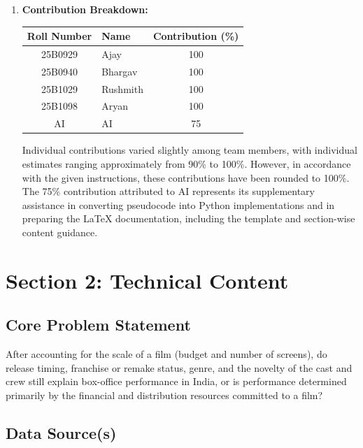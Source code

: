 \documentclass[a4paper, 11pt]{article}
\begin{document}
\begin{enumerate}
All tasks were completed, and the code was shared with Bhargav, who pushed the changes to the repository to avoid merge conflicts and ensure smooth integration.
   \item \textbf{Contribution Breakdown:}

\begin{center}
\begin{tabular}{|c|l|c|}
\hline
\textbf{Roll Number} & \textbf{Name} & \textbf{Contribution (\%)} \\
\hline
25B0929 & Ajay & 100 \\
\hline
25B0940 & Bhargav & 100 \\
\hline
25B1029 & Rushmith & 100 \\
\hline
25B1098 & Aryan & 100 \\
\hline
AI & AI & 75 \\
\hline
\end{tabular}
\end{center}

Individual contributions varied slightly among team members, with individual estimates ranging approximately from 90\% to 100\%. However, in accordance with the given instructions, these contributions have been rounded to 100\%. The 75\% contribution attributed to AI represents its supplementary assistance in converting pseudocode into Python implementations and in preparing the LaTeX documentation, including the template and section-wise content guidance.
    
\end{enumerate}

\newpage
\section*{Section 2: Technical Content}

\subsection*{Core Problem Statement}
After accounting for the scale of a film (budget and number of screens), do release
timing, franchise or remake status, genre, and the novelty of the cast and crew still explain box-office
performance in India, or is performance determined primarily by the financial and distribution resources
committed to a film?

\subsection*{Data Source(s)}
\end{document}
